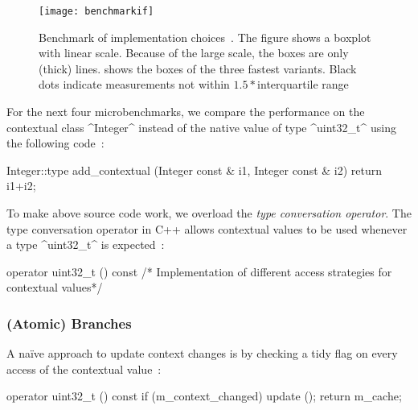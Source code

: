 \begin{figure}[htp]
\centering
\texttt{[image: benchmarkif]}
\caption[Benchmark of implementation choices.]{Benchmark of implementation choices~\cite{raab2014program}.
The figure shows a boxplot with linear scale.
Because of the large scale, the boxes are only (thick) lines.
 shows the boxes of the three fastest variants.
Black dots indicate measurements not within $1.5*$interquartile range~\cite{raab2015global}}
\label{fig:benchmarkif}
\end{figure}

For the next four microbenchmarks, we compare the performance on the contextual class ^Integer^ instead of the native value of type ^uint32_t^ using the following code~\cite{raab2014program}:

\begin{code}[language=Cpp]
Integer::type add_contextual (Integer const & i1,
				              Integer const & i2)
{
	return i1+i2;
}
\end{code}

To make above source code work, we overload the \emph{type conversation operator}.
The type conversation operator in C++ allows contextual values to be used whenever a type ^uint32_t^ is expected~\cite{raab2014program}:

\begin{code}[language=Cpp]
operator uint32_t () const
{
	/* Implementation of different access strategies
	   for contextual values*/
}
\end{code}


\subsubsection{(Atomic) Branches}

A na\"{i}ve approach to update context changes is by checking a tidy flag on every access of the contextual value~\cite{raab2014program}:

\begin{code}[language=Cpp]
operator uint32_t () const
{
	if (m_context_changed)
	{
		update ();
	}
	return m_cache;
}
\end{code}

